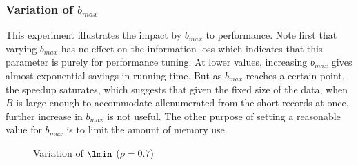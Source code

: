 \subsubsection{Variation of $b_{max}$}\label{sec:eval:buffersize}

This experiment illustrates the impact by $b_{max}$ to performance.
Note first that varying $b_{max}$ has no effect on the information loss which
indicates that this parameter is purely for performance tuning.
At lower values, increasing $b_{max}$ gives almost exponential
savings in running time. But as $b_{max}$ reaches a certain point, the speedup
saturates, which suggests that given the fixed size of the data,
when $B$ is large enough to accommodate all\qids enumerated from
the short records at once, further increase in $b_{max}$ is not useful.
The other purpose of setting a reasonable value for $b_{max}$ is to limit the
amount of memory use.


\begin{figure}[th]
\flushleft
{}
\caption{Variation of $\lmin$ ($\rho=0.7$)}\label{fig:longrecord}
\end{figure}



